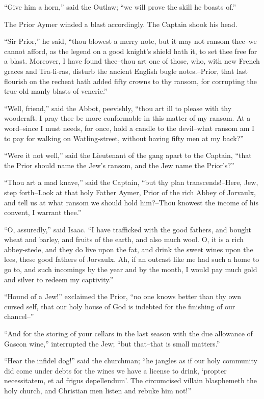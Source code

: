 ``Give him a horn,'' said the Outlaw; ``we will prove the skill he
boasts of.''

The Prior Aymer winded a blast accordingly. The Captain shook his head.

``Sir Prior,'' he said, ``thou blowest a merry note, but it may not
ransom thee--we cannot afford, as the legend on a good knight's shield
hath it, to set thee free for a blast. Moreover, I have found thee--thou
art one of those, who, with new French graces and Tra-li-ras, disturb
the ancient English bugle notes.--Prior, that last flourish on the
recheat hath added fifty crowns to thy ransom, for corrupting the true
old manly blasts of venerie.''

``Well, friend,'' said the Abbot, peevishly, ``thou art ill to please
with thy woodcraft. I pray thee be more conformable in this matter of my
ransom. At a word--since I must needs, for once, hold a candle to the
devil--what ransom am I to pay for walking on Watling-street, without
having fifty men at my back?''

``Were it not well,'' said the Lieutenant of the gang apart to the
Captain, ``that the Prior should name the Jew's ransom, and the Jew name
the Prior's?''

``Thou art a mad knave,'' said the Captain, ``but thy plan
transcends!--Here, Jew, step forth--Look at that holy Father Aymer,
Prior of the rich Abbey of Jorvaulx, and tell us at what ransom we
should hold him?--Thou knowest the income of his convent, I warrant
thee.''

``O, assuredly,'' said Isaac. ``I have trafficked with the good fathers,
and bought wheat and barley, and fruits of the earth, and also much
wool. O, it is a rich abbey-stede, and they do live upon the fat, and
drink the sweet wines upon the lees, these good fathers of Jorvaulx. Ah,
if an outcast like me had such a home to go to, and such incomings by
the year and by the month, I would pay much gold and silver to redeem my
captivity.''

``Hound of a Jew!'' exclaimed the Prior, ``no one knows better than thy
own cursed self, that our holy house of God is indebted for the
finishing of our chancel--''

``And for the storing of your cellars in the last season with the due
allowance of Gascon wine,'' interrupted the Jew; ``but that--that is
small matters.''

``Hear the infidel dog!'' said the churchman; ``he jangles as if our
holy community did come under debts for the wines we have a license to
drink, `propter necessitatem, et ad frigus depellendum'. The circumcised
villain blasphemeth the holy church, and Christian men listen and rebuke
him not!''

